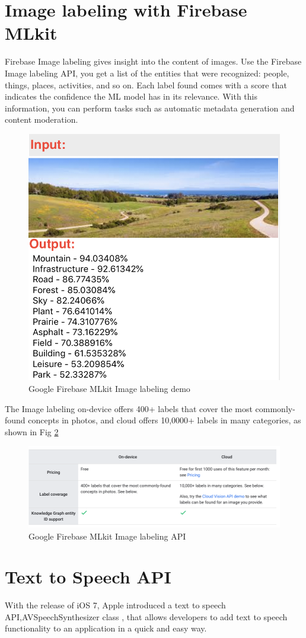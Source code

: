 \documentclass[11pt]{ucscthesis}
\begin{document}
\section{Image labeling with Firebase MLkit}
Firebase Image labeling \cite{MLImageLable} gives insight into the content of images. Use the Firebase Image labeling API, you get a list of the entities that were recognized: people, things, places, activities, and so on. Each label found comes with a score that indicates the confidence the ML model has in its relevance. With this information, you can perform tasks such as automatic metadata generation and content moderation.
\begin{figure}
    \centering
    \includegraphics[width =0.5\linewidth]{Fig/Imagelabelingdemo.png}
    \caption{Google Firebase MLkit Image labeling demo}
    \label{MLkitImage labeling}
\end{figure}
The Image labeling on-device offers 400+ labels that cover the most commonly-found concepts in photos, and cloud offers 10,0000+ labels in many categories, as shown in Fig \ref{Firebase MLkitImage labeling}
\begin{figure}
    \centering
    \includegraphics[width =0.5\linewidth]{Fig/FirebaseImageLabeling.png}
    \caption{Google Firebase MLkit Image labeling API\cite{MLImageLable}}
    \label{Firebase MLkitImage labeling}
\end{figure}

\section{Text to Speech API}
With the release of iOS 7, Apple introduced a text to speech API,AVSpeechSynthesizer class\cite{AVSpeechSynthesizer} , that allows developers to add text to speech functionality to an application in a quick and easy way.
\end{document}

